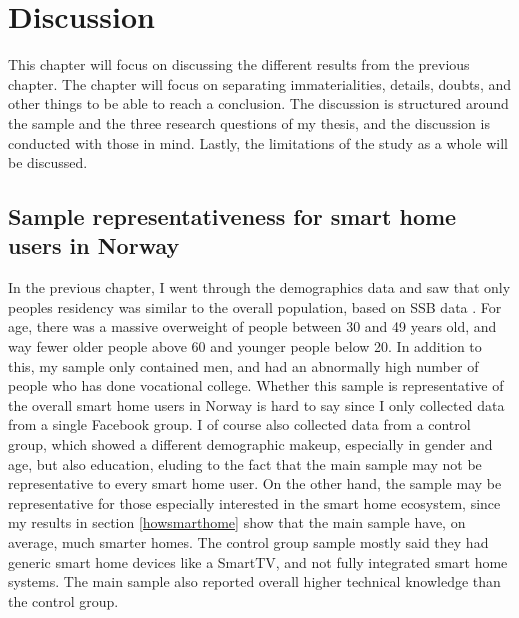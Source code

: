 \chapter{Discussion}
\label{chap:discussion}
This chapter will focus on discussing the different results from the previous chapter. The chapter will focus on separating immaterialities, details, doubts, and other things to be able to reach a conclusion. The discussion is structured around the sample and the three research questions of my thesis, and the discussion is conducted with those in mind. Lastly, the limitations of the study as a whole will be discussed. 

\section{Sample representativeness for smart home users in Norway}
In the previous chapter, I went through the demographics data and saw that only peoples residency was similar to the overall population, based on SSB data \cite{SSB_befolkning}. For age, there was a massive overweight of people between 30 and 49 years old, and way fewer older people above 60 and younger people below 20. In addition to this, my sample only contained men, and had an abnormally high number of people who has done vocational college. Whether this sample is representative of the overall smart home users in Norway is hard to say since I only collected data from a single Facebook group. I of course also collected data from a control group, which showed a different demographic makeup, especially in gender and age, but also education, eluding to the fact that the main sample may not be representative to every smart home user. On the other hand, the sample may be representative for those especially interested in the smart home ecosystem, since my results in section \ref{howsmarthome} show that the main sample have, on average, much smarter homes. The control group sample mostly said they had generic smart home devices like a SmartTV, and not fully integrated smart home systems. The main sample also reported overall higher technical knowledge than the control group.

